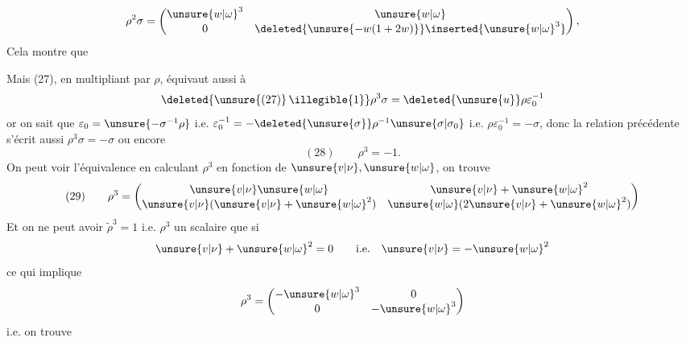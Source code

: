 

\[
\rho^2\sigma=\begin{pmatrix}\unsure{w|\omega}^3&\unsure{w|\omega}\\0&\deleted{\unsure{-w(1+2w)}}\inserted{\unsure{w|\omega}^3}\end{pmatrix},
\]
Cela montre que
\inserted{
\[
(27\mathrm{bis})\qquad
\rho^2\sigma=\varepsilon_0^{-1}\Longleftrightarrow
\left\{\unsure{v|\nu}+\unsure{w|\omega}^2=0,\ \unsure{w|\omega}^3=1\right.
\quad
\left(\Rightarrow \unsure{v|\nu}=-\unsure{w|\omega}^2=-1/\unsure{w|\omega}\ \text{i.e.}\ \unsure{w|\omega}=-1/\unsure{v|\nu},\ \mathrm{OK}\right)
\]
}

Mais (27), en multipliant par $\rho$, équivaut aussi à
\[\deleted{\unsure{(27)}\,\illegible{1}}\rho^3\sigma=\deleted{\unsure{u}}\rho\varepsilon_0^{-1}
\]
or on sait que $\varepsilon_0=\unsure{-\sigma^{-1}\rho}$  i.e. $\varepsilon_0^{-1}=-\deleted{\unsure{\sigma}}\rho^{-1}\unsure{\sigma|\sigma_0}$
i.e. $\rho\varepsilon_0^{-1}=-\sigma$, donc la relation précédente s'écrit aussi $\rho^3\sigma=-\sigma$ ou encore
\[
(28)\qquad \boxed{\rho^3=-1}.
\]
On peut voir  l'équivalence  en calculant $\rho^3$ en fonction de $\unsure{v|\nu},\unsure{w|\omega}$, on trouve
\[
(29)\qquad
\rho^3=\begin{pmatrix}\unsure{v|\nu}\unsure{w|\omega}&\unsure{v|\nu}+\unsure{w|\omega}^2\\\unsure{v|\nu}(\unsure{v|\nu}+\unsure{w|\omega}^2)&\unsure{w|\omega}(2\unsure{v|\nu}+\unsure{w|\omega}^2)\end{pmatrix}
\]
Et on ne peut avoir $\widetilde\rho^3=1$ i.e. $\rho^3$ un scalaire que si 
\[
\unsure{v|\nu}+\unsure{w|\omega}^2=0\qquad\text{i.e.}\quad \unsure{v|\nu}=-\unsure{w|\omega}^2
\]
ce qui implique
\[
\rho^3=\begin{pmatrix}-\unsure{w|\omega}^3&0\\0&-\unsure{w|\omega}^3\end{pmatrix}
\]
i.e. on trouve

